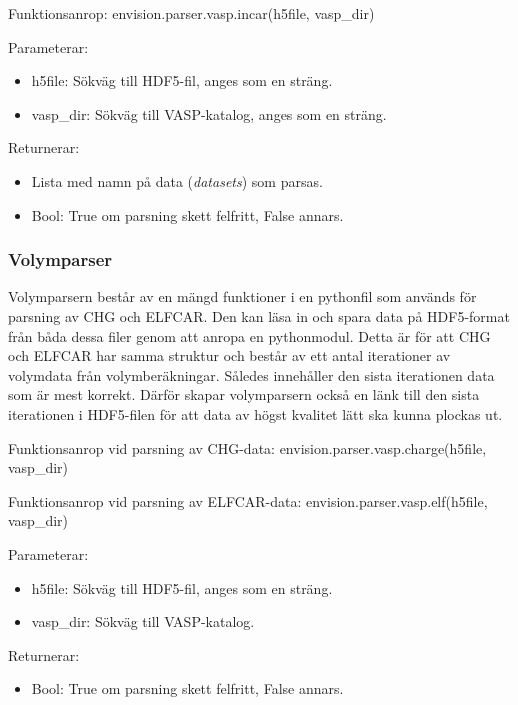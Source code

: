 Funktionsanrop: envision.parser.vasp.incar(h5file, vasp\_dir)

Parameterar: 
\begin{itemize}
    \setlength\itemsep{0em}
    \item h5file: Sökväg till HDF5-fil, anges som en sträng.
    \item vasp\_dir: Sökväg till VASP-katalog, anges som en sträng.      
\end{itemize}

Returnerar: 
\begin{itemize}
    \setlength\itemsep{0em}
    \item Lista med namn på data (\textit{datasets}) som parsas.
    \item Bool: True om parsning skett felfritt, False annars.
\end{itemize}

\subsubsection{Volymparser}
Volymparsern består av en mängd funktioner i en pythonfil som används för parsning av CHG och ELFCAR. Den kan läsa in och spara data på HDF5-format från båda dessa filer genom att anropa en pythonmodul. Detta är för att CHG och ELFCAR har samma struktur och består av ett antal iterationer av volymdata från volymberäkningar. Således innehåller den sista iterationen data som är mest korrekt. Därför skapar volymparsern också en länk till den sista iterationen i HDF5-filen för att data av högst kvalitet lätt ska kunna plockas ut.

Funktionsanrop vid parsning av CHG-data: envision.parser.vasp.charge(h5file, vasp\_dir)

Funktionsanrop vid parsning av ELFCAR-data: envision.parser.vasp.elf(h5file, vasp\_dir)

Parameterar: 
\begin{itemize}
    \setlength\itemsep{0em}
    \item h5file: Sökväg till HDF5-fil, anges som en sträng.
    \item vasp\_dir: Sökväg till VASP-katalog.      
\end{itemize}

Returnerar: 
\begin{itemize}
    \item Bool: True om parsning skett felfritt, False annars.
\end{itemize}

